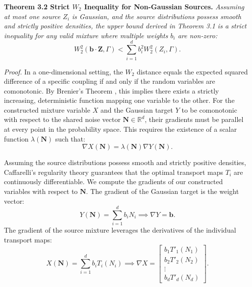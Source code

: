 \documentclass[12pt,a4paper,twoside,openany]{book}
\begin{document}
\vspace{0.5em}
\noindent\textbf{Theorem 3.2 Strict $W_2$ Inequality for Non-Gaussian Sources.} \textit{Assuming at most one source $Z_i$ is Gaussian, 
and the source distributions possess smooth and strictly positive densities, the upper bound derived in Theorem 3.1 is 
a strict inequality for any valid mixture where multiple weights $b_i$ are non-zero:}
\begin{equation}
    W_2^2(\mathbf{b} \cdot \mathbf{Z}, \Gamma) < \sum_{i=1}^d b_i^2 W_2^2(Z_i, \Gamma).
\end{equation}

\textit{Proof.} In a one-dimensional setting, the $W_2$ distance equals the expected squared difference of a specific coupling 
if and only if the random variables are comonotonic. By Brenier's Theorem \cite{brenier1991}, this implies there exists a strictly increasing, 
deterministic function mapping one variable to the other. For the constructed mixture variable $X$ and the Gaussian target $Y$ to 
be comonotonic with respect to the shared noise vector $\mathbf{N} \in \mathbb{R}^d$, their gradients must be parallel at 
every point in the probability space. This requires the existence of a scalar function $\lambda(\mathbf{N})$ such that:
\begin{equation}
    \nabla X(\mathbf{N}) = \lambda(\mathbf{N}) \nabla Y(\mathbf{N}).
\end{equation}

Assuming the source distributions possess smooth and strictly positive densities, Caffarelli's regularity theory \cite{caffarelli1992} 
guarantees that the optimal transport maps $T_i$ are continuously differentiable. We compute the gradients of our 
constructed variables with respect to $\mathbf{N}$. The gradient of the Gaussian target is the weight vector:
\begin{equation}
    Y(\mathbf{N}) = \sum_{i=1}^d b_i N_i \implies \nabla Y = \mathbf{b}.
\end{equation}
The gradient of the source mixture leverages the derivatives of the individual transport maps:
\begin{equation}
    X(\mathbf{N}) = \sum_{i=1}^d b_i T_i(N_i) \implies \nabla X = \begin{bmatrix} b_1 T'_1(N_1) \\ b_2 T'_2(N_2) \\ \vdots \\ b_d T'_d(N_d) \end{bmatrix}.
\end{equation}
\end{document}
